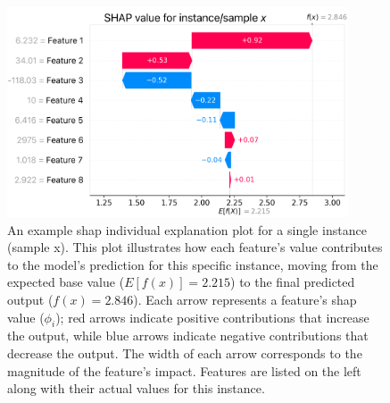 \documentclass[12pt,a4paper]{report}
\begin{document}
\begin{figure}[h!]
  \centering
  \includegraphics[width=0.9\textwidth]{images/SHAP-explained-individual.png}
  \caption[Example \gls{shap} Individual Explanation Plot]{An example \gls{shap} individual explanation plot for a single instance (sample x). This plot illustrates how each feature's value contributes to the model's prediction for this specific instance, moving from the expected base value ($E[f(x)] = 2.215$) to the final predicted output ($f(x) = 2.846$). Each arrow represents a feature's \gls{shap} value ($\phi_i$); red arrows indicate positive contributions that increase the output, while blue arrows indicate negative contributions that decrease the output. The width of each arrow corresponds to the magnitude of the feature's impact. Features are listed on the left along with their actual values for this instance.}
  \label{fig:SHAP-individual-explained} %
\end{figure}
\end{document}
